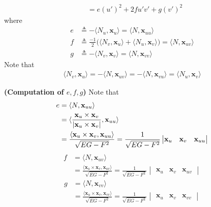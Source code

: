 \documentclass{report}
\begin{document}
\begin{mdframed}
\begin{align*}
&=e(u')^2 + 2fu'v'+ g(v')^2
\end{align*}
where 
\begin{align*}
e&\triangleq -\langle N_u,\textbf{x}_u\rangle = \langle N,\textbf{x}_{uu}\rangle \\
f&\triangleq \frac{-1}{2}\Big(\langle N_v,\textbf{x}_u\rangle + \langle N_u,\textbf{x}_v\rangle   \Big)= \langle N,\textbf{x}_{uv}\rangle \\
g&\triangleq -\langle N_v, \textbf{x}_v\rangle =\langle N,\textbf{x}_{vv}\rangle 
\end{align*}
Note that 
\begin{align*}
\langle N_v, \textbf{x}_u\rangle = -\langle N,\textbf{x}_{uv}\rangle = - \langle N ,\textbf{x}_{vu}\rangle =  \langle N_u,\textbf{x}_v\rangle 
\end{align*}
\end{mdframed}
\begin{mdframed}
\textbf{(Computation of $e,f,g$)} Note that 
\begin{align*}
e&=\langle N,\textbf{x}_{uu}\rangle \\
&=\langle \frac{\textbf{x}_u \times \textbf{x}_v}{\left|\textbf{x}_u \times \textbf{x}_v\right|}, \textbf{x}_{uu}\rangle \\
&= \frac{\langle \textbf{x}_u \times \textbf{x}_v, \textbf{x}_{uu}\rangle }{\sqrt{EG-F^2} }= \frac{1}{\sqrt{EG-F^2} }\begin{vmatrix} 
  \textbf{x}_u & \textbf{x}_v & \textbf{x}_{uu}
\end{vmatrix}
\end{align*}
\begin{align*}
f&=\langle N,\textbf{x}_{uv}\rangle \\
&=\frac{\langle  \textbf{x}_u \times \textbf{x}_v , \textbf{x}_{uv}\rangle}{\sqrt{EG-F^2} }= \frac{1}{\sqrt{EG-F^2} }\begin{vmatrix} 
  \textbf{x}_u & \textbf{x}_v & \textbf{x}_{uv}
\end{vmatrix}
\end{align*}
\begin{align*}
g&=\langle N,\textbf{x}_{vv}\rangle \\
&= \frac{\langle \textbf{x}_u \times \textbf{x}_v , \textbf{x}_{vv}\rangle }{\sqrt{EG-F^2} }= \frac{1}{\sqrt{EG-F^2} }\begin{vmatrix} 
  \textbf{x}_u & \textbf{x}_v & \textbf{x}_{vv}
\end{vmatrix}
\end{align*}
\end{mdframed}
\end{document}
